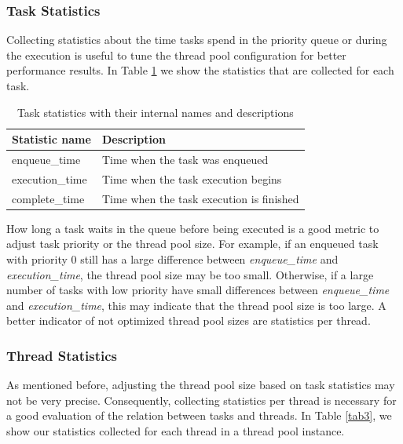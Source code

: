 \documentclass[conference]{IEEEtran}
\begin{document}
\subsubsection{Task Statistics}
Collecting statistics about the time tasks spend in the priority queue or during the execution is useful to tune the thread pool configuration for better performance results. In Table \ref{tab2} we show the statistics that are collected for each task.

\begin{table}[htbp]
	\caption{Task statistics with their internal names and descriptions}
	\begin{center}
		\begin{tabular}{ l l }
			\hline
			\textbf{Statistic name}&\textbf{Description}\\
			\hline
			enqueue\_time & Time when the task was enqueued \\
			execution\_time & Time when the task execution begins \\
			complete\_time & Time when the task execution is finished \\
			\hline
		\end{tabular}
		\label{tab2}
	\end{center}
\end{table}

How long a task waits in the queue before being executed is a good metric to adjust task priority or the thread pool size. For example, if an enqueued task with priority 0 still has a large difference between \emph{enqueue\_time} and \emph{execution\_time}, the thread pool size may be too small. Otherwise, if a large number of tasks with low priority have small differences between \emph{enqueue\_time} and \emph{execution\_time}, this may indicate that the thread pool size is too large. A better indicator of not optimized thread pool sizes are statistics per thread.

\subsubsection{Thread Statistics}
As mentioned before, adjusting the thread pool size based on task statistics may not be very precise. Consequently, collecting statistics per thread is necessary for a good evaluation of the relation between tasks and threads. In Table \ref{tab3}, we show our statistics collected for each thread in a thread pool instance.
\end{document}
